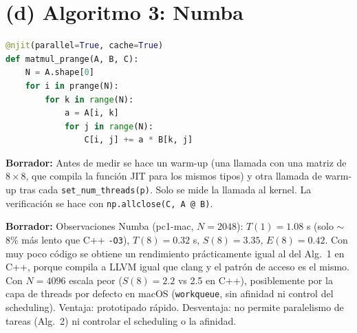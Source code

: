 \documentclass[11pt,a4paper]{article}
\newcommand{\pcA}{pc1-mac}
\newcommand{\nota}[1]{\par\noindent\colorbox{yellow!25}{\parbox{\dimexpr\linewidth-2\fboxsep}{\small\textbf{Borrador:} #1}}\par}
\begin{document}
\section{(d) Algoritmo 3: Numba}
\begin{lstlisting}[language=Python]
@njit(parallel=True, cache=True)
def matmul_prange(A, B, C):
    N = A.shape[0]
    for i in prange(N):
        for k in range(N):
            a = A[i, k]
            for j in range(N):
                C[i, j] += a * B[k, j]
\end{lstlisting}
\nota{Antes de medir se hace un warm-up (una llamada con una matriz de $8\times8$, que compila la función JIT para los mismos tipos) y otra llamada de warm-up tras cada \texttt{set\_num\_threads(p)}. Solo se mide la llamada al kernel. La verificación se hace con \texttt{np.allclose(C, A @ B)}.}
\nota{Observaciones Numba (\pcA, $N=2048$): $T(1)=1.08$ s (solo $\sim$8\% más lento que C++ \texttt{-O3}), $T(8)=0.32$ s, $S(8)=3.35$, $E(8)=0.42$. Con muy poco código se obtiene un rendimiento prácticamente igual al del Alg.~1 en C++, porque compila a LLVM igual que clang y el patrón de acceso es el mismo. Con $N=4096$ escala peor ($S(8)=2.2$ vs 2.5 en C++), posiblemente por la capa de threads por defecto en macOS (\texttt{workqueue}, sin afinidad ni control del scheduling). Ventaja: prototipado rápido. Desventaja: no permite paralelismo de tareas (Alg.~2) ni controlar el scheduling o la afinidad.}

\end{document}
